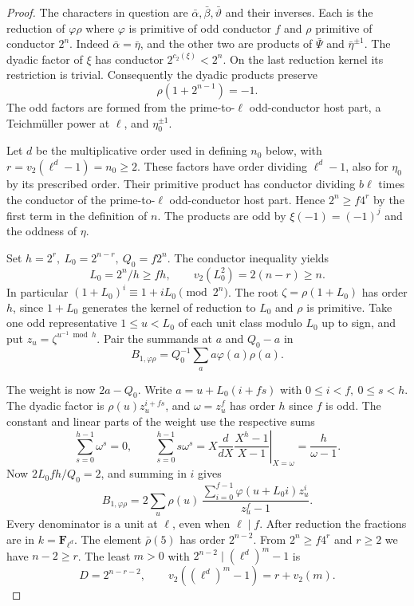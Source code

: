 \begin{proof}

The characters in question are \(\bar\alpha,\bar\beta,\bar\vartheta\)
and their inverses. Each is the reduction of \(\varphi\rho\) where
\(\varphi\) is primitive of odd conductor \(f\) and \(\rho\) primitive
of conductor \(2^n\). Indeed \(\bar\alpha=\bar\eta\), and the other
two are products of \(\bar\Psi\) and \(\bar\eta^{\pm1}\). The dyadic factor of \(\xi\) has conductor
\(2^{c_2(\xi)}<2^n\). On the last reduction kernel its
restriction is trivial. Consequently the dyadic products preserve
\[
          \rho(1+2^{n-1})=-1 .
\] The odd factors
are formed from the prime-to-\(\ell\) odd-conductor host part, a
Teichm\"uller power at \(\ell\), and \(\eta_0^{\pm1}\).

Let \(d\)
be the multiplicative order used in defining \(n_0\) below, with
\(r=v_2(\ell^d-1)=n_0\ge2\). These factors have order dividing
\(\ell^d-1\), also for \(\eta_0\) by its prescribed order. Their
primitive product has conductor dividing \(b\ell\) times the
conductor of the prime-to-\(\ell\) odd-conductor host part. Hence
\(2^n\ge f4^r\) by the first term in the definition of \(n\).
The products are odd by \(\xi(-1)=(-1)^j\) and the oddness of \(\eta\).

Set \(h=2^r,\ L_0=2^{n-r},\ Q_0=f2^n\). The conductor inequality yields
\[
 L_0=2^n/h\ge fh,\qquad v_2(L_0^2)=2(n-r)\ge n .
\]
In particular \((1+L_0)^i\equiv1+iL_0\pmod{2^n}\). The root \(\zeta=\rho(1+L_0)\)
has order \(h\), since \(1+L_0\) generates the kernel of reduction
to \(L_0\) and \(\rho\) is primitive. Take one odd representative
\(1\le u<L_0\) of each unit class modulo \(L_0\) up to sign,
and put \(z_u=\zeta^{u^{-1}\bmod h}\). Pair the summands at \(a\)
and \(Q_0-a\) in
\[
 B_{1,\varphi\rho}=Q_0^{-1}\sum_a a\varphi(a)\rho(a).
\]

The weight is now \(2a-Q_0\). Write \(a=u+L_0(i+fs)\) with
\(0\le i<f,\ 0\le s<h\). The dyadic factor is \(\rho(u)z_u^{i+fs}\), and
\(\omega=z_u^f\) has order \(h\) since \(f\) is odd.
The constant and linear parts of the weight use the respective sums
\[
       \sum_{s=0}^{h-1}\omega^s=0,\qquad
       \sum_{s=0}^{h-1}s\omega^s
          =\left.X\frac{d}{dX}\frac{X^h-1}{X-1}\right|_{X=\omega}
          =\frac{h}{\omega-1}.
\] Now
\(2L_0 f h/Q_0=2\), and summing in \(i\) gives
\[
 B_{1,\varphi\rho}=2\sum_u \rho(u)\,
       \frac{\sum_{i=0}^{f-1}\varphi(u+L_0i)z_u^i}{z_u^f-1}.
\]
Every denominator is a unit at \(\ell\), even when \(\ell\mid f\).
After reduction the fractions are in \(k=\mathbf F_{\ell^d}\).
The element \(\bar\rho(5)\) has order \(2^{n-2}\). From
\(2^n\ge f4^r\) and \(r\ge2\) we have \(n-2\ge r\). The least
\(m>0\) with \(2^{n-2}\mid(\ell^d)^m-1\) is
\[
         D=2^{n-r-2},
        \qquad v_2((\ell^d)^m-1)=r+v_2(m).
\]


\end{proof}
